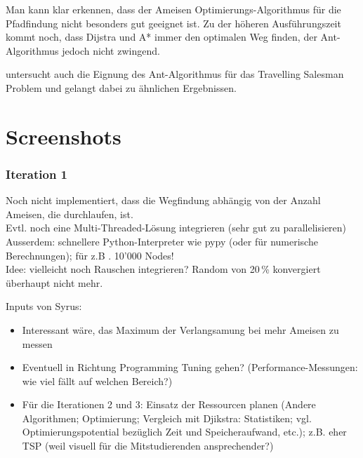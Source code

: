 Man kann klar erkennen, dass der Ameisen Optimierungs-Algorithmus für die Pfadfindung nicht besonders gut geeignet ist. Zu der höheren Ausführungszeit kommt noch, dass Dijstra und A* immer den optimalen Weg finden, der Ant-Algorithmus jedoch nicht zwingend.

\citeauthor*{leo-perf} untersucht auch die Eignung des Ant-Algorithmus für das Travelling Salesman Problem und gelangt dabei zu ähnlichen Ergebnissen.

\section{Screenshots}

\subsubsection*{Iteration 1}

Noch nicht implementiert, dass die Wegfindung abhängig von der Anzahl Ameisen, die durchlaufen, ist. \\

Evtl. noch eine Multi-Threaded-Lösung integrieren (sehr gut zu parallelisieren) \\

Ausserdem: schnellere Python-Interpreter wie pypy (oder für numerische Berechnungen); für z.B . 10'000 Nodes! \\

Idee: vielleicht noch Rauschen integrieren? Random von 20\,\% konvergiert überhaupt nicht mehr.

\vspace*{3cm}


Inputs von Syrus: \\

\begin{itemize}
\item Interessant wäre, das Maximum der Verlangsamung bei mehr Ameisen zu messen
\item Eventuell in Richtung Programming Tuning gehen? (Performance-Messungen: wie viel fällt auf welchen Bereich?) 
\item Für die Iterationen 2 und 3: Einsatz der Ressourcen planen (Andere Algorithmen; Optimierung; Vergleich mit Djikstra: Statistiken; vgl. Optimierungspotential bezüglich Zeit und Speicheraufwand, etc.); z.B. eher TSP (weil visuell für die Mitstudierenden ansprechender?) 
\end{itemize}